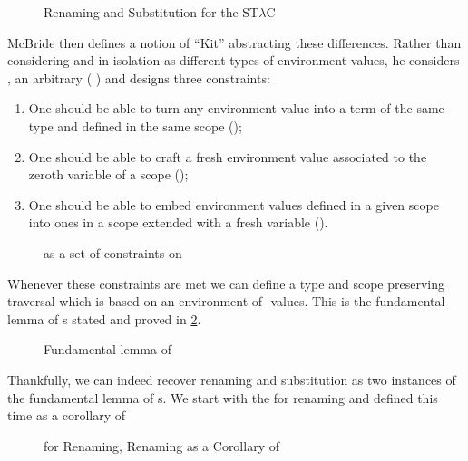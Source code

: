 \begin{figure}[h]
\caption{Renaming\label{ren} and Substitution\label{sub} for the ST$λ$C}
\end{figure}

McBride then defines a notion of ``Kit'' abstracting these differences.
Rather than considering  and  in isolation as different
types of environment values, he considers , an arbitrary
( ) and designs three constraints:

\begin{enumerate}
  \item
    One should be able to turn any environment value into a term of
    the same type and defined in the same scope ();
  \item
    One should be able to craft a fresh environment value associated
    to the zeroth variable of a scope ();
  \item
    One should be able to embed environment values defined in a given
    scope into ones in a scope extended with a fresh variable ().
\end{enumerate}

\begin{figure}[h]
\caption{ as a set of constraints on }
\end{figure}

Whenever these constraints are met we can define a type and scope preserving
traversal which is based on an environment of -values. This is the
fundamental lemma of s stated and proved in \cref{fig:kitlemma}.

\begin{figure}[h]
\caption{Fundamental lemma of \label{fig:kitlemma}}
\end{figure}

Thankfully, we can indeed recover renaming and substitution as two instances of
the fundamental lemma of s. We start with the  for renaming
and  defined this time as a corollary of 

\begin{figure}[h]
\begin{minipage}{0.4\textwidth}
\end{minipage}
\begin{minipage}{0.6\textwidth}
\end{minipage}
\caption{ for Renaming, Renaming as a Corollary of \label{fig:renkit}}
\end{figure}

